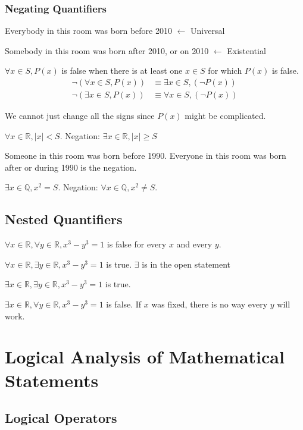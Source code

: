 \documentclass{article}
\begin{document}
\subsubsection{Negating Quantifiers}

Everybody in this room was born before 2010 $\leftarrow$ Universal

Somebody in this room was born after 2010, or on 2010 $\leftarrow$ Existential

$\forall x \in S, P(x)$ is false when there is at least one $x \in S$ for which $P(x)$ is false.
\begin{align*}
    \neg(\forall x \in S, P(x)) &\equiv \exists x \in S, (\neg P(x)) \\
    \neg(\exists x \in S, P(x)) &\equiv \forall x \in S, (\neg P(x))
\end{align*}

We cannot just change all the signs since $P(x)$ might be complicated.

$\forall x \in \mathbb{R}, |x| < S$. Negation: $\exists x \in \mathbb{R}, |x| \ge S$

Someone in this room was born before 1990.
Everyone in this room was born after or during 1990 is the negation. 

$\exists x \in \mathbb{Q}, x^2 = S$. Negation: $\forall x \in \mathbb{Q}, x^2 \ne S$.

\subsection{Nested Quantifiers}

$\forall x \in \mathbb{R}, \forall y \in \mathbb{R}, x^3-y^3 = 1$ is false for every $x$ and every $y$. 

$\forall x \in \mathbb{R}, \exists y \in \mathbb{R}, x^3-y^3 = 1$ is true. $\exists$ is in the open statement

$\exists x \in \mathbb{R}, \exists y \in \mathbb{R}, x^3 - y^3 = 1$ is true. 

$\exists x \in \mathbb{R}, \forall y \in \mathbb{R}, x^3 - y^3 = 1$ is false. If $x$ was fixed, there is no way every $y$ will work. 

\section{Logical Analysis of Mathematical Statements}

\subsection{Logical Operators}
\end{document}
